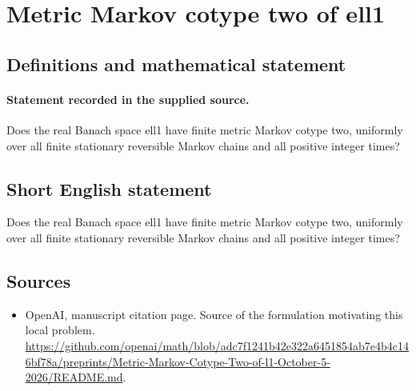 \documentclass[11pt]{article}
\begin{document}
\section*{Metric Markov cotype two of ell1}\label{statement}
\subsection{Definitions and mathematical statement}
\paragraph{Statement recorded in the supplied source.}
Does the real Banach space ell1 have finite metric Markov cotype two, uniformly over all finite stationary reversible Markov chains and all positive integer times?
\subsection{Short English statement}
Does the real Banach space ell1 have finite metric Markov cotype two, uniformly over all finite stationary reversible Markov chains and all positive integer times?
\subsection{Sources}
\begin{itemize}
\item[S1] OpenAI, manuscript citation page. Source of the formulation motivating this local problem.
\url{https://github.com/openai/math/blob/adc7f1241b42e322a6451854ab7e4b4c146bf78a/preprints/Metric-Markov-Cotype-Two-of-l1-October-5-2026/README.md}.
\end{itemize}
\end{document}
